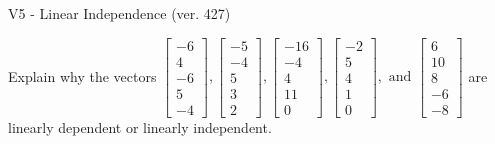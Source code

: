 \begin{exercise}
  \begin{exerciseTitle}V5 - Linear Independence (ver. 427)\end{exerciseTitle}
  \begin{exerciseStatement}
    Explain why the vectors \(\left[\begin{array}{r}
-6 \\
4 \\
-6 \\
5 \\
-4
\end{array}\right] , \left[\begin{array}{r}
-5 \\
-4 \\
5 \\
3 \\
2
\end{array}\right] , \left[\begin{array}{r}
-16 \\
-4 \\
4 \\
11 \\
0
\end{array}\right] , \left[\begin{array}{r}
-2 \\
5 \\
4 \\
1 \\
0
\end{array}\right] , \text{ and } \left[\begin{array}{r}
6 \\
10 \\
8 \\
-6 \\
-8
\end{array}\right]\) are linearly dependent or linearly independent.	



\end{exerciseStatement}
\end{exercise}
